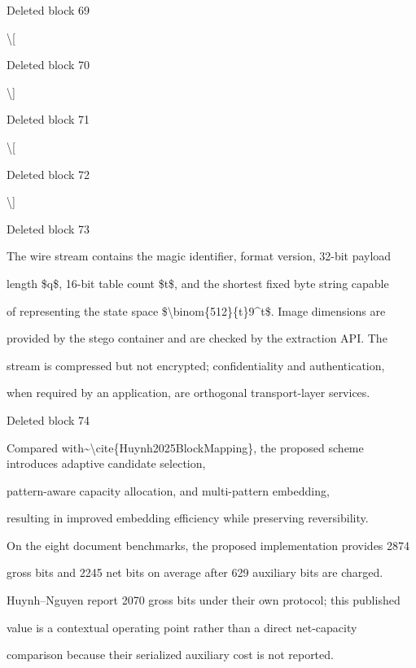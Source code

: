 \documentclass[a4paper,fleqn]{cas-dc}
\newenvironment{RevisionDeletion}{%
  \par\begingroup\color{revisionred}\footnotesize\ttfamily
  \setlength{\parindent}{0pt}\setlength{\parskip}{1pt}\obeyspaces
}{\par\endgroup}
\begin{document}
\begin{RevisionDeletion}
Deleted block 69\par
\textbackslash{}[\par
\end{RevisionDeletion}

\begin{RevisionDeletion}
Deleted block 70\par
\textbackslash{}]\par
\end{RevisionDeletion}

\begin{RevisionDeletion}
Deleted block 71\par
\textbackslash{}[\par
\end{RevisionDeletion}

\begin{RevisionDeletion}
Deleted block 72\par
\textbackslash{}]\par
\end{RevisionDeletion}

\begin{RevisionDeletion}
Deleted block 73\par
The wire stream contains the magic identifier, format version, 32-bit payload\par
length \$q\$, 16-bit table count \$t\$, and the shortest fixed byte string capable\par
of representing the state space \$\textbackslash{}binom\{512\}\{t\}9\textasciicircum{}t\$. Image dimensions are\par
provided by the stego container and are checked by the extraction API. The\par
stream is compressed but not encrypted; confidentiality and authentication,\par
when required by an application, are orthogonal transport-layer services.\par
\end{RevisionDeletion}

\begin{RevisionDeletion}
Deleted block 74\par
Compared with\textasciitilde{}\textbackslash{}cite\{Huynh2025BlockMapping\}, the proposed scheme introduces adaptive candidate selection,\par
pattern-aware capacity allocation, and multi-pattern embedding,\par
resulting in improved embedding efficiency while preserving reversibility.\par
On the eight document benchmarks, the proposed implementation provides 2874\par
gross bits and 2245 net bits on average after 629 auxiliary bits are charged.\par
Huynh--Nguyen report 2070 gross bits under their own protocol; this published\par
value is a contextual operating point rather than a direct net-capacity\par
comparison because their serialized auxiliary cost is not reported.\par
\end{RevisionDeletion}
\end{document}
